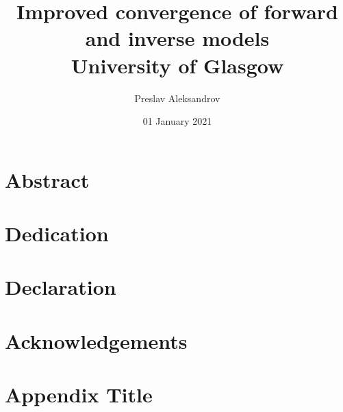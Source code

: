 \documentclass[12pt,twoside]{report} %
\title{
Improved convergence of forward and inverse models\\
{\large University of Glasgow}\\
}
\author{Preslav Aleksandrov}
\date{01 January 2021}
\begin{document}
\maketitle 

\tableofcontents %

\chapter{Abstract} %


\chapter{Dedication}


\chapter{Declaration}


\chapter{Acknowledgements} %



\appendix %
\chapter{Appendix Title}

\end{document}
